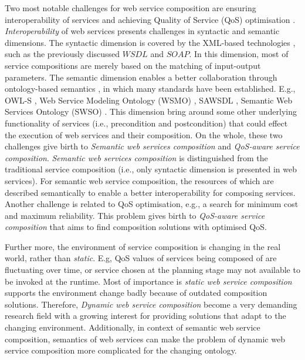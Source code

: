 Two most notable challenges for web service composition are ensuring interoperability of services and achieving Quality of Service (QoS) optimisation \cite{fensel2011semantic}. \emph{Interoperability} of web services presents challenges in syntactic and semantic dimensions. The syntactic dimension is covered by the XML-based technologies \cite{yu2008deploying}, such as the previously discussed $WSDL$ and $SOAP$. In this dimension, most of service compositions are merely based on the matching of input-output parameters. The semantic dimension enables a better collaboration through ontology-based semantics \cite{o2005review}, in which many standards have been established. E.g., OWL-S \cite{martin2004owl}, Web Service Modeling Ontology (WSMO) \cite{lausen2005w3c}, SAWSDL \cite{kopecky2007sawsdl}, Semantic Web Services Ontology (SWSO) \cite{petrie2016web}. This dimension bring around some other underlying functionality of services (i.e., precondition and postcondition) that could effect the execution of web services and their composition. On the whole, these two challenges give birth to \emph{Semantic web services composition} and \emph{QoS-aware service composition}. \emph{Semantic web services composition} is distinguished from the traditional service composition (i.e., only syntactic dimension is presented in web services). For semantic web service composition,  the resources of which are described semantically to enable a better interoperability for composing services. Another challenge is related to QoS optimisation, e.g., a search for minimum cost and maximum reliability. This problem gives birth to \emph{QoS-aware service composition} that aims to find composition solutions with optimised QoS. 

Further more, the environment of service composition is changing in the real world, rather than \emph{static}. E.g, QoS values of services being composed of are fluctuating over time, or service chosen at the planning stage may not available to be invoked at the runtime. Most of importance is \emph{static web service composition} supports the environment change badly because of outdated composition solutions. Therefore, \emph{Dynamic web service composition} become a very demanding research field with a growing interest for providing solutions that adapt to the changing environment. Additionally, in context of semantic web service composition, semantics of web services can make the problem of dynamic web service composition more complicated for the changing ontology.


